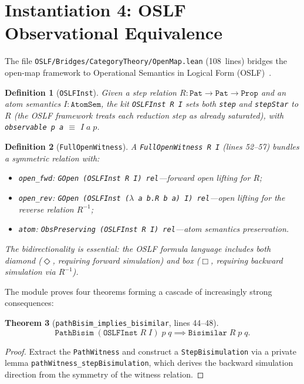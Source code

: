 \documentclass[11pt]{article}
\newtheorem{theorem}{Theorem}[section]
\newtheorem{definition}[theorem]{Definition}
\begin{document}
\section{Instantiation 4: OSLF Observational Equivalence}\label{sec:oslf}

The file \texttt{OSLF/Bridges/CategoryTheory/OpenMap.lean} (108~lines) bridges the
open-map framework to Operational Semantics in Logical Form
(OSLF)~\cite{MeredithStayOSLF2020,leanOSLF2025}.

\begin{definition}[\texttt{OSLFInst}]
Given a step relation $R : \texttt{Pat} \to \texttt{Pat} \to \texttt{Prop}$
and an atom semantics $I : \texttt{AtomSem}$, the kit
\texttt{OSLFInst R I} sets both \texttt{step} and \texttt{stepStar} to
$R$ (the OSLF framework treats each reduction step as already
saturated), with \texttt{observable p a} $\equiv$ $I\;a\;p$.
\end{definition}

\begin{definition}[\texttt{FullOpenWitness}]
A \texttt{FullOpenWitness R I} (lines 52--57) bundles a symmetric
relation with:
\begin{itemize}
\item \texttt{open\_fwd}: \texttt{GOpen (OSLFInst R I) rel}---forward
  open lifting for $R$;
\item \texttt{open\_rev}: \texttt{GOpen (OSLFInst ($\lambda$\,a\,b.\;R\,b\,a) I) rel}---open
  lifting for the reverse relation $R^{-1}$;
\item \texttt{atom}: \texttt{ObsPreserving (OSLFInst R I) rel}---atom
  semantics preservation.
\end{itemize}
The bidirectionality is essential: the OSLF formula language includes
both diamond ($\Diamond$, requiring forward simulation) and box
($\Box$, requiring backward simulation via $R^{-1}$).
\end{definition}

The module proves four theorems forming a cascade of increasingly strong
consequences:

\begin{theorem}[\texttt{pathBisim\_implies\_bisimilar}, lines 44--48]\label{thm:oslf-bisim}
\[
  \texttt{PathBisim}\;(\texttt{OSLFInst}\;R\;I)\;p\;q \implies
  \texttt{Bisimilar}\;R\;p\;q.
\]
\end{theorem}
\begin{proof}
Extract the \texttt{PathWitness} and construct a
\texttt{StepBisimulation} via a private lemma
\texttt{pathWitness\_stepBisimulation}, which derives the backward
simulation direction from the symmetry of the witness relation.
\end{proof}
\end{document}
